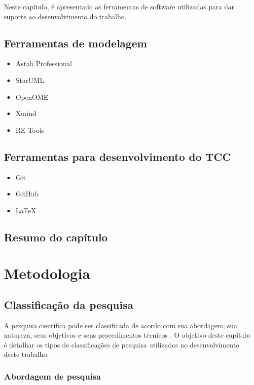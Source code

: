 Neste capítulo, é apresentado as ferramentas de software utilizadas para dar suporte ao desenvolvimento do trabalho. 

\section{Ferramentas de modelagem}
\label{sec:ferramentasModelagem}

\begin{itemize}
	\item Astah Professional
	\item StarUML
	\item OpenOME
	\item Xmind
	\item RE-Tools
\end{itemize}

\section{Ferramentas para desenvolvimento do TCC}
\label{ferramentasDesenvolvimento}

\begin{itemize}
	\item Git
	\item GitHub
	\item LaTeX 
\end{itemize}

\section{Resumo do capítulo}

\chapter{Metodologia}

\section{Classificação da pesquisa}

A pesquisa científica pode ser classificada de acordo com sua abordagem, sua natureza, seus objetivos e seus procedimentos técnicos \cite{gerhardt2009metodos}. O objetivo deste capítulo é detalhar os tipos de classificações de pesquisa utilizados no desenvolvimento deste trabalho. 

\subsection{Abordagem de pesquisa}

